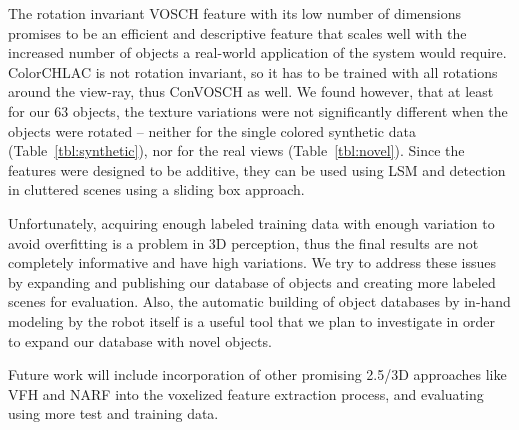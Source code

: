 \documentclass[conference]{sty/IEEEtran}
\begin{document}
The rotation invariant VOSCH feature with its low number of dimensions
promises to be an efficient and descriptive feature that scales well with
the increased number of objects a real-world application of the system would
require. ColorCHLAC is not rotation invariant, so it has to be trained with
all rotations around the view-ray, thus ConVOSCH as well. We found
however, that at least for our 63 objects, the texture variations
were not significantly different when the objects were rotated
-- neither for the single colored synthetic data (Table~\ref{tbl:synthetic}),
nor for the real views (Table~\ref{tbl:novel}).
Since the features were designed to be additive, they can be used using
LSM and detection in cluttered scenes using a sliding box approach.

Unfortunately, acquiring enough labeled training data with enough variation
to avoid overfitting is a problem in 3D perception, thus the final results are
not completely informative and have high variations.
We try to address these issues by expanding and publishing our database of objects
and creating more labeled scenes for evaluation.
Also, the automatic building of object databases by in-hand modeling by the
robot itself is a useful tool that we plan to investigate in order to expand
our database with novel objects.

Future work will include incorporation of other promising 2.5/3D approaches like VFH and NARF
into the voxelized feature extraction process, and evaluating using more test and training data.






\end{document}
